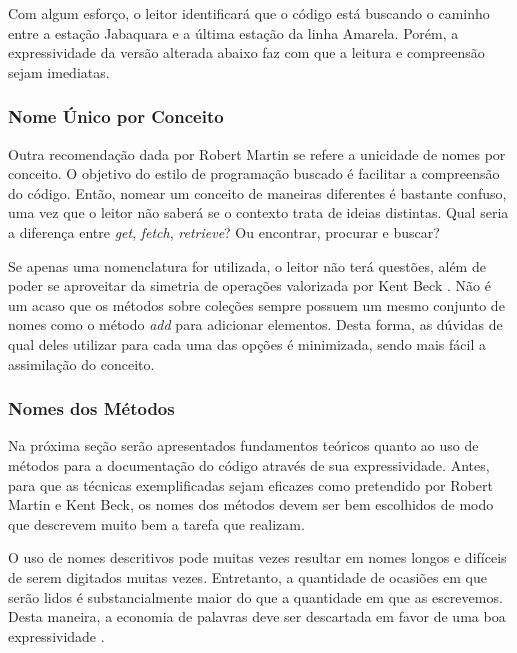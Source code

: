 

Com algum esforço, o leitor identificará que o código está buscando o caminho entre a estação Jabaquara e a última estação da linha Amarela. Porém, a expressividade da versão alterada abaixo faz com que a leitura e compreensão sejam imediatas.




\subsubsection{Nome Único por Conceito}
Outra recomendação dada por Robert Martin \citep{Martin2008} se refere a unicidade de nomes por conceito. O objetivo do estilo de programação buscado é facilitar a compreensão do código. Então, nomear um conceito de maneiras diferentes é bastante confuso, uma vez que o leitor não saberá se o contexto trata de ideias distintas. Qual seria a diferença entre \textit{get}, \textit{fetch}, \textit{retrieve}? Ou encontrar, procurar e buscar?
	
Se apenas uma nomenclatura for utilizada, o leitor não terá questões, além de poder se aproveitar da simetria de operações valorizada por Kent Beck \citep{Beck2007}. Não é um acaso que os métodos sobre coleções sempre possuem um mesmo conjunto de nomes como o método \textit{add} para adicionar elementos. Desta forma, as dúvidas de qual deles utilizar para cada uma das opções é minimizada, sendo mais fácil a assimilação do conceito.

\subsubsection{Nomes dos Métodos}
Na próxima seção serão apresentados fundamentos teóricos quanto ao uso de métodos para a documentação do código através de sua expressividade. Antes, para que as técnicas exemplificadas sejam eficazes como pretendido por Robert Martin e Kent Beck, os nomes dos métodos devem ser bem escolhidos de modo que descrevem muito bem a tarefa que realizam.
	
O uso de nomes descritivos pode muitas vezes resultar em nomes longos e difíceis de serem digitados muitas vezes. Entretanto, a quantidade de ocasiões em que serão lidos é substancialmente maior do que a quantidade em que as escrevemos. Desta maneira, a economia de palavras deve ser descartada em favor de uma boa expressividade \citep{Beck2007}.
	
